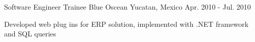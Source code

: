 \begin{cventries}

\cventry
{Software Engineer Trainee} %
{Blue Oscean} %
{Yucatan, Mexico} %
{Apr. 2010 - Jul. 2010} %
{ %
\begin{cvitems}
\item {Developed web plug ins for ERP solution, implemented with .NET framework and SQL queries}
\end{cvitems}
}






\end{cventries}
